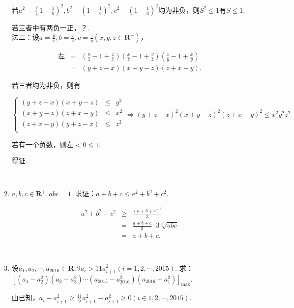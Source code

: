 \documentclass[8pt]{article}
\begin{document}
\begin{enumerate}
			若$\displaystyle a^2-\left(1-\frac{1}{b}\right)^2, b^2-\left(1-\frac{1}{c}\right)^2, c^2-\left(1-\frac{1}{a}\right)^2$均为非负，则$S^2\leq 1$有$S\leq 1$.

			若三者中有两负一正，？.
			~\\

			法二：设$\displaystyle a=\frac{y}{x}, b=\frac{x}{z}, c=\frac{z}{y} (x,y,z\in\mathbf{R}^+)$，

			$$
			\begin{array}{rcl}
				\text{左}&=&\displaystyle\left(\frac{y}{z}-1+\frac{z}{x}\right)\left(\frac{x}{z}-1+\frac{y}{z}\right)\left(\frac{z}{y}-1+\frac{x}{y}\right)\\
				&=&(y+z-x)(x+y-z)(z+x-y).
			\end{array}
			$$

			若三者均为非负，则有

			$$
			\left\{
				\begin{array}{rcl}
					(y+z-x)(x+y-z)&\leq&y^2\\
					(x+y-z)(z+x-y)&\leq&x^2\\
					(z+x-y)(y+z-x)&\leq&z^2\\
				\end{array}
			\right.\Rightarrow(y+z-x)^2(x+y-z)^2(z+x-y)^2\leq x^2y^2z^2
			$$

			若有一个负数，则左$<0\leq 1$.

			得证.

		~\\

		\item $a, b, c\in\mathbf{R}^+, abc=1$. 求证：$a+b+c\leq a^2+b^2+c^2.$

			$$
			\begin{array}{rcl}
				a^2+b^2+c^2&\geq&\frac{(a+b+c)^2}{3}\\
				&=&\frac{a+b+c}{3}\cdot 3\sqrt[3]{abc}\\
				&=&a+b+c.
			\end{array}
			$$

		~\\

		\item 设$a_1, a_2, \cdots, a_{2016} \in \mathbf{R}, 9a_i>11a_{i+1}^2 (i=1,2,\cdots,2015).$ 求：$\displaystyle\left[\left(a_1-a_2^2\right)\left(a_2-a_3^2\right)\cdots\left(a_{2015}-a_{2016}^2\right)\left(a_{2016}-a_1^2\right)\right]_{\max}$.

			由已知，$\displaystyle a_i-a_{i+1}^2\geq\frac{11}{9}a_{i+1}^2-a_{i+1}^2\geq0 (i\in1, 2, \cdots, 2015).$


\end{enumerate}
\end{document}
